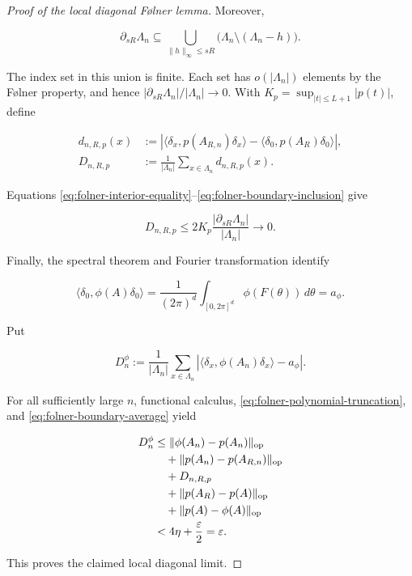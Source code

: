 \begin{proof}[Proof of the local diagonal Følner lemma]
Moreover,

\begin{equation}\label{eq:folner-boundary-inclusion}
\partial_{sR}\Lambda_n
\subseteq
\bigcup_{\|h\|_\infty\le sR}
\bigl(\Lambda_n\setminus(\Lambda_n-h)\bigr).
\end{equation}

The index set in this union is finite. Each set has
\(o(|\Lambda_n|)\) elements by the Følner property, and hence
\(|\partial_{sR}\Lambda_n|/|\Lambda_n|\to0\).
With
\(K_p=\sup_{|t|\le L+1}|p(t)|\), define

\begin{align*}
d_{n,R,p}(x)
&:=
\left|
\langle\delta_x,p(A_{R,n})\delta_x\rangle
-\langle\delta_0,p(A_R)\delta_0\rangle
\right|,\\
D_{n,R,p}
&:=\frac1{|\Lambda_n|}\sum_{x\in\Lambda_n}d_{n,R,p}(x).
\end{align*}

Equations
\eqref{eq:folner-interior-equality}--\eqref{eq:folner-boundary-inclusion} give

\begin{equation}\label{eq:folner-boundary-average}
D_{n,R,p}
\le2K_p\frac{|\partial_{sR}\Lambda_n|}{|\Lambda_n|}
\longrightarrow0.
\end{equation}

Finally, the spectral theorem and Fourier transformation identify

\[
\langle\delta_0,\phi(A)\delta_0\rangle
=\frac1{(2\pi)^d}\int_{[0,2\pi]^d}\phi(F(\theta))\,d\theta
=a_\phi.
\]

Put

\[
D_n^\phi:=\frac1{|\Lambda_n|}\sum_{x\in\Lambda_n}
\left|\langle\delta_x,\phi(A_n)\delta_x\rangle-a_\phi\right|.
\]

For all sufficiently large \(n\), functional calculus,
\eqref{eq:folner-polynomial-truncation}, and
\eqref{eq:folner-boundary-average} yield

\begin{align*}
D_n^\phi
&\le
\|\phi(A_n)-p(A_n)\|_{\rm op}\\
&\quad+\|p(A_n)-p(A_{R,n})\|_{\rm op}\\
&\quad+D_{n,R,p}\\
&\quad+\|p(A_R)-p(A)\|_{\rm op}\\
&\quad+\|p(A)-\phi(A)\|_{\rm op}\\
&<4\eta+\frac{\varepsilon}{2}=\varepsilon.
\end{align*}

This proves the claimed local diagonal limit.
\end{proof}

